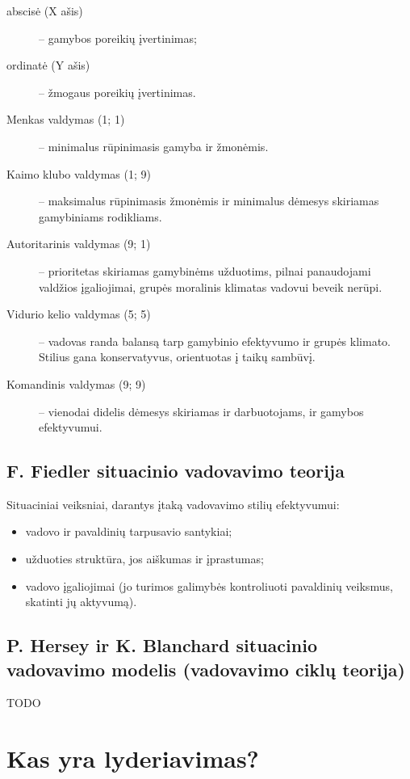 \begin{description}
  \item[abscisė (X ašis)] – gamybos poreikių įvertinimas;
  \item[ordinatė (Y ašis)] – žmogaus poreikių įvertinimas.
\end{description}

\begin{description}
  \item[Menkas valdymas (1; 1)] – minimalus rūpinimasis gamyba ir žmonėmis.
  \item[Kaimo klubo valdymas (1; 9)] – maksimalus rūpinimasis žmonėmis
    ir minimalus dėmesys skiriamas gamybiniams rodikliams.
  \item[Autoritarinis valdymas (9; 1)] – prioritetas skiriamas gamybinėms
    užduotims, pilnai panaudojami valdžios įgaliojimai, grupės moralinis
    klimatas vadovui beveik nerūpi.
  \item[Vidurio kelio valdymas (5; 5)] – vadovas randa balansą tarp
    gamybinio efektyvumo ir grupės klimato. Stilius gana konservatyvus,
    orientuotas į taikų sambūvį.
  \item[Komandinis valdymas (9; 9)] – vienodai didelis dėmesys skiriamas
    ir darbuotojams, ir gamybos efektyvumui.
\end{description}

\subsection{F. Fiedler situacinio vadovavimo teorija}

Situaciniai veiksniai, darantys įtaką vadovavimo stilių efektyvumui:
\begin{itemize}
  \item vadovo ir pavaldinių tarpusavio santykiai;
  \item užduoties struktūra, jos aiškumas ir įprastumas;
  \item vadovo įgaliojimai (jo turimos galimybės kontroliuoti pavaldinių
    veiksmus, skatinti jų aktyvumą).
\end{itemize}

\subsection{P. Hersey ir K. Blanchard situacinio vadovavimo modelis
(vadovavimo ciklų teorija)}

TODO

\section{Kas yra lyderiavimas?}

